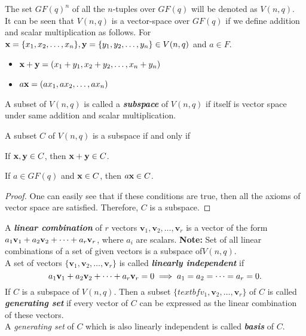 \documentclass[../main.tex]{subfiles}
\begin{document}
The set $GF(q)^n$ of all the $n$-tuples over $GF(q)$ will be denoted as $V(n,q)$.\\
It can be seen that $V(n,q)$ is a vector-space over $GF(q)$ if we define addition and 	scalar multiplication as follows. For $\textbf{x}=\{x_1,x_2,\ldots,x_n\},\textbf{y}=\{y_1,y_2,\ldots,y_n\} \in V(n,q)$ and $a\in F$.
\begin{itemize}
	\itemsep-1mm
	\item $\textbf{x} + \textbf{y} = (x_1+y_1,x_2+y_2,\ldots,x_n+y_n)$
	\item $a\textbf{x}=(ax_1, ax_2,\ldots,ax_n)$
\end{itemize}
\begin{defn}
	A subset of $V(n,q)$ is called a \textbf{\emph{subspace}} of $V(n,q)$ if itself is vector space under same addition and scalar multiplication.
\end{defn}
\begin{thm}
	A subset $C$ of $V(n,q)$ is a subspace if and only if\\   
	\begin{enumerate*}[label=(\roman*), before=\unskip{}]
		\item If $\textbf{x},\textbf{y} \in C$, then $\textbf{x}+\textbf{y} \in C$.\\
		\item If $a\in GF(q)$ and $\textbf{x}\in C$, then $a\textbf{x}\in C$.
	\end{enumerate*}
\end{thm}
\begin{proof}
	One can easily see that if these conditions are true, then all the axioms of vector space are satisfied. Therefore, $C$ is a subspace.
\end{proof}
A \textbf{\emph{linear combination}} of $r$ vectors $\textbf{v}_1,\textbf{v}_2,\ldots,\textbf{v}_r$ is a vector of the form $a_1\textbf{v}_1+a_2\textbf{v}_2+\cdots+a_r\textbf{v}_r$, where $a_i$ are scalars. \textbf{Note:} Set of all linear combinations of a set of given vectors is a subspace of$V(n,q)$.\\
A set of vectors $\{\textbf{v}_1,\textbf{v}_2,\ldots,\textbf{v}_r\}$ is called \textbf{\emph{linearly independent}} if
\[
	a_1\textbf{v}_1+a_2\textbf{v}_2+\cdots+a_r\textbf{v}_r=0 \implies a_1=a_2=\cdots=a_r=0.
\]
If $C$ is a subspace of $V(n,q)$. Then a subset $\{textbf{v}_1,\textbf{v}_2,\ldots,\textbf{v}_r\}$ of $C$ is called \textbf{\emph{generating set}} if every vector of $C$ can be expressed as the linear combination of these vectors.\\
A \emph{generating set} of $C$ which is also linearly independent is called \textbf{\emph{basis}} of $C$.
\end{document}
